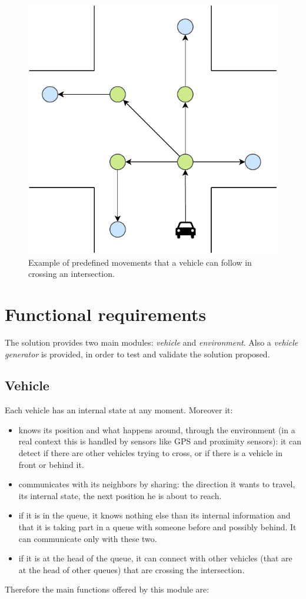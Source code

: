 \documentclass{memoir}
\begin{document}
\begin{figure}
	\centering
	\includegraphics[width=0.4\linewidth]{intersection_graph.pdf}
	\caption{Example of predefined movements that a vehicle can follow in crossing an intersection.}
	\label{fig:intersection-graph}
\end{figure}

\section{Functional requirements}
The solution provides two main modules: \emph{vehicle} and \emph{environment}. Also a \emph{vehicle generator} is provided, in order to test and validate the solution proposed.

\subsection{Vehicle}
Each vehicle has an internal state at any moment. Moreover it:

\begin{itemize}
	\item knows its position and what happens around, through the environment (in a real context this is handled by sensors like GPS and proximity sensors): it can detect if there are other vehicles trying to cross, or if there is a vehicle in front or behind it.
	\item communicates with its neighbors by sharing: the direction it wants to travel, its internal state, the next position he is about to reach.
	\item if it is in the queue, it knows nothing else than its internal information and that it is taking part in a queue with someone before and possibly behind. It can communicate only with these two.
	\item if it is at the head of the queue, it can connect with other vehicles (that are at the head of other queues) that are crossing the intersection.
\end{itemize}
Therefore the main functions offered by this module are:
\end{document}
